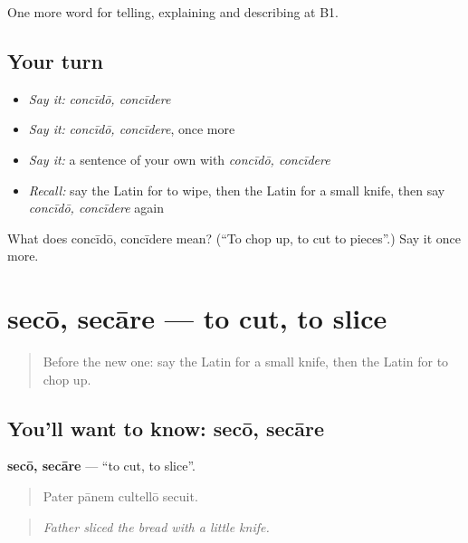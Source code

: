 \begin{grammarlens}[title={What you've built}]
One more word for telling, explaining and describing at B1.
\end{grammarlens}

\subsection*{Your turn}
\begin{itemize}
\raggedright
  \item \emph{Say it:} \emph{concīdō, concīdere}
  \item \emph{Say it:} \emph{concīdō, concīdere}, once more
  \item \emph{Say it:} a sentence of your own with \emph{concīdō, concīdere}
  \item \emph{Recall:} say the Latin for to wipe, then the Latin for a small knife, then say \emph{concīdō, concīdere} again
\end{itemize}

\begin{tcolorbox}[breakable,colback=teal!4,colframe=teal!35!black,title={Before you move on}]
What does concīdō, concīdere mean? (\textquotedblleft{}To chop up, to cut to pieces\textquotedblright{}.) Say it once more.
\end{tcolorbox}
\section[secō, secāre]{secō, secāre — to cut, to slice}

\label{lesson:LA-C351-seco}



\begin{quote}
Before the new one: say the Latin for a small knife, then the Latin for to chop up.
\end{quote}

\subsection*{You'll want to know: secō, secāre}
\textbf{secō, secāre} — \textquotedblleft{}to cut, to slice\textquotedblright{}.

\begin{quote}
Pater pānem cultellō secuit.
\end{quote}

\begin{quote}
\emph{Father sliced the bread with a little knife.}
\end{quote}

